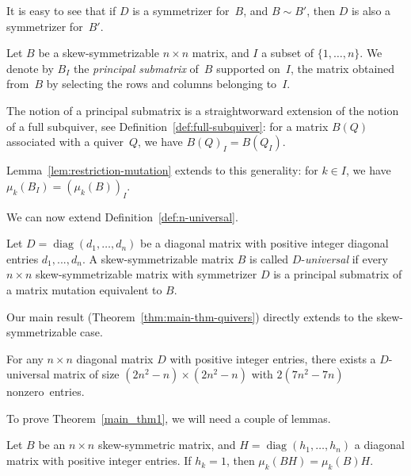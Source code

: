 \documentclass[ALCO,ThmDefs,Unicode,epreuves,published]{cedram}
\DeclareMathOperator{\diag}{diag}
\begin{document}
It is easy to see that if $D$ is a symmetrizer for~$B$, and $B\sim B'$, then $D$ is also a symmetrizer for~$B'$. 

\begin{definition}
Let $B$ be a skew-symmetrizable $n\times n$ matrix, and $I$ a subset of $\{1,\dots,n\}$. We denote by $B_I$ the \emph{principal submatrix} of~$B$ supported on~$I$, \ie the matrix obtained from~$B$ by selecting the rows and columns belonging to~$I$. 
\end{definition}

\begin{remark}
The notion of a principal submatrix is a straightworward extension of the notion of a full subquiver, see Definition~\ref{def:full-subquiver}: for a matrix $B(Q)$ associated with a quiver~$Q$, we have $B(Q)_I=B(Q_I)$. 

Lemma~\ref{lem:restriction-mutation} extends to this generality: for $k\in I$, we have $\mu_k(B_I)=(\mu_k(B))_I$. 
\end{remark}


We can now extend Definition~\ref{def:n-universal}. 

\begin{definition}
Let $D=\diag (d_1,\dots,d_n)$ be a diagonal matrix with positive integer diagonal entries $d_1,...,d_n$. 
A skew-symmetrizable matrix $B$ is called $D$-\emph{universal} if every $n\times n$ skew-symmetrizable matrix with symmetrizer $D$ is a principal submatrix of a matrix mutation equivalent to $B$. 
\end{definition}

Our main result (Theorem~\ref{thm:main-thm-quivers}) directly extends to the skew-symmetrizable case. 

\begin{theorem}
\label{main_thm1}
For any $n\times n$ diagonal matrix $D$ with positive integer entries, there exists a $D$-universal matrix of size $(2n^2\!-\!n)\!\times\!(2n^2\!-\!n)$ with $2(7n^2\!-\!7n)$ nonzero~entries. 
\end{theorem}

To prove Theorem~\ref{main_thm1}, we will need a couple of lemmas. 

\begin{lemma}
\label{lem:mu-BD}
Let $B$ be an $n\times n$ skew-symmetric matrix, and $H=\diag (h_1,\dots,h_n)$ a diagonal matrix with positive integer entries. If $h_k=1$, then $\mu_k(BH)=\mu_k(B)H$. 
\end{lemma}
\end{document}
